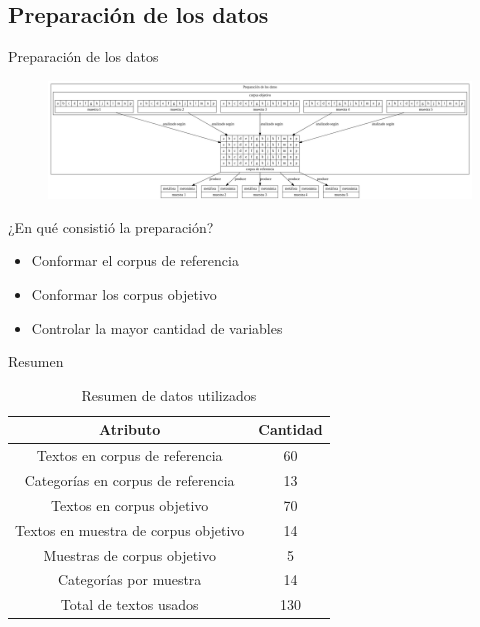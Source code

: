 \documentclass[presentation]{beamer}
\begin{document}
\subsection{Preparación de los datos}
\label{sec:orge9caf80}
\begin{frame}[label={sec:org6e025dd}]{Preparación de los datos}
\begin{figure}
\includegraphics[width=\textwidth]{./assets/preparacion_visualizacion.png}
\end{figure}

\begin{block}{¿En qué consistió la preparación?}
\begin{itemize}
\item Conformar el corpus de referencia
\item Conformar los corpus objetivo
\item Controlar la mayor cantidad de variables
\end{itemize}
\end{block}
\end{frame}
\begin{frame}[label={sec:orgce826fa}]{Resumen}
     \begin{table}[!ht]
    \centering

    \begin{tabular}{|c|c|}
    \hline
      Atributo & Cantidad \\ \hline
      Textos en corpus de referencia & 60 \\ \hline
      Categorías en corpus de referencia  & 13 \\ \hline
     Textos en corpus objetivo & 70 \\ \hline
     Textos en muestra de corpus objetivo & 14 \\ \hline
     Muestras de corpus objetivo & 5 \\ \hline
     Categorías por muestra & 14  \\ \hline
     Total de textos usados & 130  \\ \hline
    \end{tabular}
\caption{Resumen de datos utilizados}
\label{tab:resumen_preparacion}
\end{table}
\end{frame}
\end{document}
